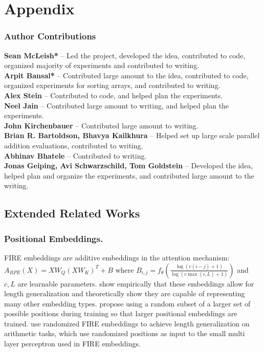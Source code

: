 \documentclass{article}
\begin{document}
% 


% 

\newpage
\appendix

\section{Appendix}
\subsubsection*{Author Contributions}
\textbf{Sean McLeish*} -- Led the project, developed the idea, contributed to code, organized majority of experiments and contributed to writing. \\
\textbf{Arpit Bansal*} -- Contributed large amount to the idea, contributed to code, organized experiments for sorting arrays, and contributed to writing. \\
\textbf{Alex Stein} -- Contributed to code, and helped plan the experiments. \\
\textbf{Neel Jain} -- Contributed large amount to writing, and helped plan the experiments. \\
\textbf{John Kirchenbauer} --  Contributed large amount to writing. \\
\textbf{Brian R. Bartoldson, Bhavya Kailkhura} -- Helped set up large scale parallel addition evaluations, contributed to writing. \\
\textbf{Abhinav Bhatele} -- Contributed to writing.\\
\textbf{Jonas Geiping, Avi Schwarzschild, Tom Goldstein} -- Developed the idea, helped plan and organize the experiments, and contributed large amount to the writing.

\subsection{Extended Related Works}
\subsubsection{Positional Embeddings.}
\label{app:rel-works-pos-emb}
FIRE embeddings are additive embeddings in the attention mechanism:
\(A_{RPE}(X)=XW_Q(XW_K)^T+B\) where \(B_{i,j}=f_\theta \left (\frac{\log(c(i-j)+1)}{\log(c\max(i,L)+1)}\right )\) and \(c,L\) are learnable parameters.
\citet{li2023functional} show empirically that these embeddings allow for length generalization and theoretically show they are capable of representing many other embedding types.
\citet{ruoss2023randomized} propose using a random subset of a larger set of possible positions during training so that larger positional embeddings are trained. 
\citet{zhou2024transformers} use randomized FIRE \citep{ruoss2023randomized, li2023functional} embeddings to achieve length generalization on arithmetic tasks, which use randomized positions as input to the small multi layer perceptron used in FIRE embeddings. 
\end{document}
